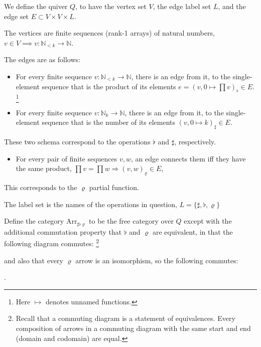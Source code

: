 \documentclass{DIKU-report-variant}
\newcommand\mrm[1]{\mathrm{#1}}
\newcommand\brm[1]{\bm{\mrm{#1}}}
\newcommand\Nat{\mathbb{N}}
\newcommand\Arr[1]{{\brm{Arr}_{\brm{#1}}}}
\newcommand\SFR{\sharp\flat\varrho}
\newcommand\impl{\mathrel{\Rightarrow}}
\begin{document}
\begin{definition}
  \label{def:category-of-shapes}
  We define the quiver \(Q\), to have the vertex set \(V\), the edge label set \(L\),
  and the edge set \(E \subset V\times V\times L\).

  The vertices are finite sequences (rank-1 arrays)
  of natural numbers, \(v \in V \implies v : \Nat_{<k} \to \Nat\).
  
  The edges are as follows:
  \begin{itemize}
    \item For every finite sequence \(v : \Nat_{<k} \to \Nat\),
      there is an edge from it, to the single-element sequence
      that is the product of its elements \(e = (v, 0 \mapsto \prod v)_\flat \in E\).
      \footnote{Here \(\mapsto\) denotes unnamed functions.}
    \item For every finite sequence \(v : \Nat_k \to \Nat\),
      there is an edge from it, to the single-element sequence
      that is the number of its elements \((v, 0 \mapsto k)_\sharp \in E\).
  \end{itemize}
  These two schema correspond to the operations \(\flat\) and \(\sharp\), respectively.

  \begin{itemize}
    \item For every pair of finite sequences \(v, w\), an edge
      connects them iff they have the same product, \(\prod v = \prod w \impl (v, w)_\varrho \in E\),
  \end{itemize}
  This corresponds to the \(\varrho\) partial function. 

  The label set is the names of the operations in question, \(L = \{\sharp,\flat,\varrho\}\)

  Define the category \(\Arr\SFR\) to be the free category over \(Q\)
  except with the additional commutation
  property that \(\flat\) and \(\varrho\) are equivalent, in that the following diagram commutes:
    \footnote{Recall that a commuting diagram is a statement of equivalences. Every composition
    of arrows in a commuting diagram with the same start and end (domain and codomain) are equal.}
  \begin{center}
  \end{center}
  and also that every \(\varrho\) arrow is an isomorphism, so the following commutes:
  \begin{center}
  .
  \end{center}


\end{definition}
\end{document}

